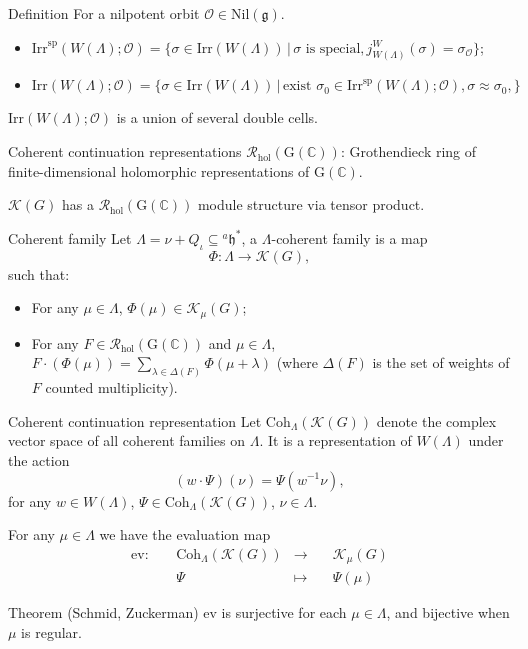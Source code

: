 \documentclass[fleqn,xcolor=dvipsnames]{beamer}
\newcommand{\BC}{{\mathbb {C}}}
\newcommand{\CK}{{\mathcal {K}}}
\newcommand{\CO}{{\mathcal {O}}}
\newcommand{\CR}{{\mathcal {R}}}
\newcommand{\RG}{{\mathrm {G}}}
\newcommand{\fg}{\mathfrak{g}}
\newcommand{\fh}{\mathfrak{h}}
\newcommand{\Irr}{{\mathrm{Irr}}}
\newcommand{\Nil}{{\mathrm{Nil}}}
\newcommand{\set}[2]{\{#1\,|\,#2\}}
\newcommand{\defmap}[5]{
           \begin{equation*}
              \begin{aligned}
                   #1:\quad  & #2 &\longrightarrow &\quad #3 \\
                      \quad  & #4    &\longmapsto  &\quad #5
              \end{aligned}
           \end{equation*}
          }
\begin{document}
\begin{frame}
  \begin{block}{Definition}
    For a nilpotent orbit $\CO \in \Nil(\fg)$.
    \begin{itemize}
      \item $\Irr^{\mathrm{sp}}(W(\Lambda);\CO) = \set{\sigma \in \Irr(W(\Lambda))}{\textrm{$\sigma$ is special}, j_{W(\Lambda)}^{W}(\sigma) = \sigma_{\CO}}$;
      \item $\Irr(W(\Lambda);\CO) = \set{\sigma \in \Irr(W(\Lambda))}{\textrm{exist $\sigma_{0} \in \Irr^{\mathrm{sp}}(W(\Lambda);\CO)$}, \sigma \approx \sigma_{0}, }$
    \end{itemize}
  \end{block}
  $\Irr(W(\Lambda);\CO)$ is a union of several double cells.
\end{frame}



\begin{frame}{Coherent continuation representations}
  $\CR_{\mathrm{hol}}(\RG(\BC))$: Grothendieck ring of finite-dimensional holomorphic representations of $\RG(\BC)$.\par
  $\CK(G)$ has a $\CR_{\mathrm{hol}}(\RG(\BC))$ module structure via tensor product.
  \begin{block}{Coherent family}
    Let $\Lambda = \nu + Q_{\iota} \subseteq {^{a}\fh}^*$, a \alert{$\Lambda$-coherent family}  is a map
   $$\Phi: \Lambda \to \CK(G),$$
   such that:
   \begin{itemize}
      \item For any $\mu \in \Lambda$, $\Phi(\mu) \in \CK_{\mu}(G)$;
      \item For any $F \in \CR_{\mathrm{hol}}(\RG(\BC))$ and $\mu \in \Lambda$, $F \cdot (\Phi(\mu)) = \sum_{\lambda \in \Delta(F)} \Phi(\mu + \lambda)$ (where $\Delta(F)$ is the set of weights of $F$ counted multiplicity).
   \end{itemize}
  \end{block}
\end{frame}






\begin{frame}
  \begin{block}{Coherent continuation representation}
  Let $\mathrm{Coh}_{\Lambda}(\CK(G))$ denote the complex vector space of all coherent families on $\Lambda$. It is a representation of $W(\Lambda)$ under the action
  \[(w \cdot \Psi)(\nu) = \Psi(w^{-1}\nu),\]
  for any $w \in W(\Lambda)$, $\Psi \in \mathrm{Coh}_{\Lambda}(\CK(G))$, $\nu \in \Lambda$.
  \end{block}
     For any $\mu \in \Lambda$ we have the evaluation map \defmap{\mathrm{ev}}{\mathrm{Coh}_{\Lambda}(\CK(G))}{\CK_{\mu}(G)}{\Psi}{\Psi(\mu)}
  \begin{block}{Theorem (Schmid, Zuckerman)}
    $\mathrm{ev}$ is surjective for each $\mu \in \Lambda$, and bijective when $\mu$ is regular.
  \end{block}

\end{frame}
\end{document}
